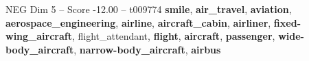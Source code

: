 \begin{textsample}{NEG Dim 5 – Score -12.00 – t009774}  \label{ex:f5_neg_032}
\textbf{smile}, \textbf{air\_travel}, \textbf{aviation}, \textbf{aerospace\_engineering}, \textbf{airline}, \textbf{aircraft\_cabin}, \textbf{airliner}, \textbf{fixed-wing\_aircraft}, flight\_attendant, \textbf{flight}, \textbf{aircraft}, \textbf{passenger}, \textbf{wide-body\_aircraft}, \textbf{narrow-body\_aircraft}, \textbf{airbus}

\end{textsample}
